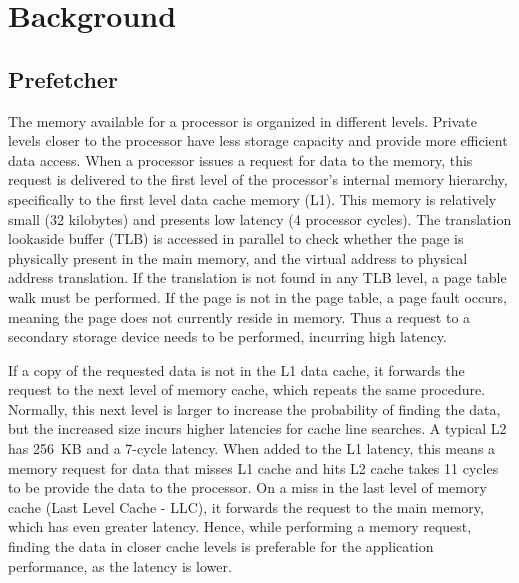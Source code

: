 \documentclass[AMA,final,STIX1COL]{WileyNJD-v2}
\begin{document}
\section{Background}\label{sec:definitions}



\subsection{Prefetcher}

The memory available for a processor is organized in different levels.
Private levels closer to the processor have less storage capacity and provide more efficient data access. 
When a processor issues a request for data to the memory, this request is delivered to the first level of the processor's internal memory hierarchy, specifically to the first level data cache memory (L1).
This memory is relatively small (32 kilobytes) and presents low latency (4 processor cycles).
The translation lookaside buffer (TLB) is accessed in parallel to check whether the page is physically present in the main memory, and the virtual address to physical address translation.
If the translation is not found in any TLB level, a page table walk must be performed.
If the page is not in the page table, a page fault occurs, meaning the page does not currently reside in memory.
Thus a request to a secondary storage device needs to be performed, incurring high latency.

If a copy of the requested data is not in the L1 data cache, it forwards the request to the next level of memory cache, which repeats the same procedure.
Normally, this next level is larger to increase the probability of finding the data, but the increased size incurs higher latencies for cache line searches.
A typical L2 has 256~KB and a 7-cycle latency.
When added to the L1 latency, this means a memory request for data that misses L1 cache and hits L2 cache takes 11 cycles to be provide the data to the processor.
On a miss in the last level of memory cache (Last Level Cache - LLC), it forwards the request to the main memory, which has even greater latency. 
Hence, while performing a memory request, finding the data in closer cache levels is preferable for the application performance, as the latency is lower.
\end{document}
